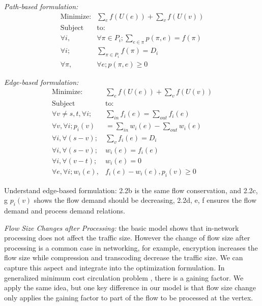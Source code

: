 \begin{minipage}[t]{0.45\textwidth}
\textit{Path-based formulation:}
  \begin{subequations}
\begin{align}
\text{Minimize:} & \sum \limits_{e} f(U(e)) + \sum \limits_{v} f(U(v)) \\  \nonumber
\text{Subject } &\text{to:} \\
\forall i,& \forall \pi\in P_i; \sum \limits_{e\in \pi} p(\pi, e) = f(\pi)\\
\forall i;& \sum\limits_{\pi\in P_i}f(\pi) = D_i\\
\forall \pi,&\forall e;p(\pi,e) \geq 0
\end{align}
\end{subequations}
  \end{minipage}
\hspace{0cm}
\begin{minipage}[t]{0.50\textwidth}
\textit{Edge-based formulation:}
  \begin{subequations}
\begin{align}
\text{Minimize:}&\sum \limits_{e} f(U(e)) + \sum \limits_{v} f(U(v)) \\ \nonumber
\text{Subject } &\text{to:}\\
\forall v \not= s,t,\forall i;& \sum\limits_{in}  f_i(e)=  \sum\limits_{out} f_i(e)\\
\forall v,\forall  i; p_i(v)& = \sum\limits_{in} w_i(e) - \sum\limits_{out} w_i(e) \\
\forall  i, \forall (s-v); &\sum\limits_v f_i(e)= D_i\\
\forall  i,\forall (s-v);& w_i(e)= f_i(e)\\
\forall  i,\forall (v-t);& w_i(e)= 0\\
\forall e,\forall i;w_i(e),& f_i(e)-w_i(e), p_i(v) \geq 0
\end{align}
\end{subequations}
\end{minipage}

Understand edge-based formulation: 2.2b is the same flow conservation, and 2.2c, g $p_i(v)$ shows the flow demand should be decreasing, 2.2d, e, f ensures the flow demand and process demand relations. 

\emph{Flow Size Changes after Processing:} the basic model shows that in-network processing does not affect the traffic size. However the change of flow size after processing is a common case in networking, for example, encryption increases the flow size while compression and transcoding decrease the traffic size\cite{Mogul1997}. We can capture this aspect and integrate into the optimization formulation. In generalized minimum cost circulation problem \cite{Wayne1999}, there is a gaining factor. We apply the same idea, but one key difference in our model is that flow size change only applies the gaining factor to part of the flow to be processed at the vertex. 


